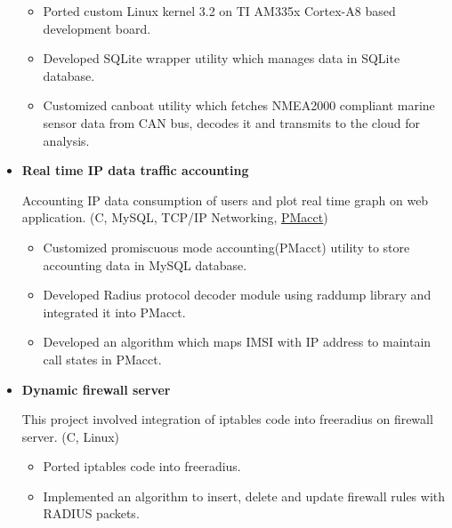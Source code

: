 \documentclass[letterpaper,11pt]{article}
\newcommand{\resitem}[1]{\item #1 \vspace{-2pt}}
\begin{document}
\begin{itemize}
	\begin{itemize}
	    \resitem{Ported custom Linux kernel 3.2 on TI AM335x Cortex-A8 based development board.}
	    
	    \resitem{Developed SQLite wrapper utility which manages data in SQLite database.}
	    
	    \resitem{Customized canboat utility which fetches NMEA2000 compliant marine sensor data from CAN bus, decodes it and transmits to the cloud for analysis.}

	\end{itemize}

\item
    \textbf{Real time IP data traffic accounting}
    
    Accounting IP data consumption of users and plot real time graph on web application. (C, MySQL, TCP/IP Networking, \href{https://github.com/mehul-m-prajapati/pmacct}{PMacct})
	\begin{itemize}
	    \resitem{Customized promiscuous mode accounting(PMacct) utility to store accounting data in MySQL database.}
	
	    \resitem{Developed Radius protocol decoder module using raddump library and integrated it into PMacct.}
	    
	    \resitem{Developed an algorithm which maps IMSI with IP address to maintain call states in PMacct.}
	    
	\end{itemize}
	
\item
	\textbf{Dynamic firewall server}
	
	This project involved integration of iptables code into freeradius on firewall server. (C, Linux)
	
	\begin{itemize}
	    \resitem{Ported iptables code into freeradius. }
	    
	    \resitem{Implemented an algorithm to insert, delete and update firewall rules with RADIUS packets.}
	
	\end{itemize}
	
\end{itemize}
\end{document}
